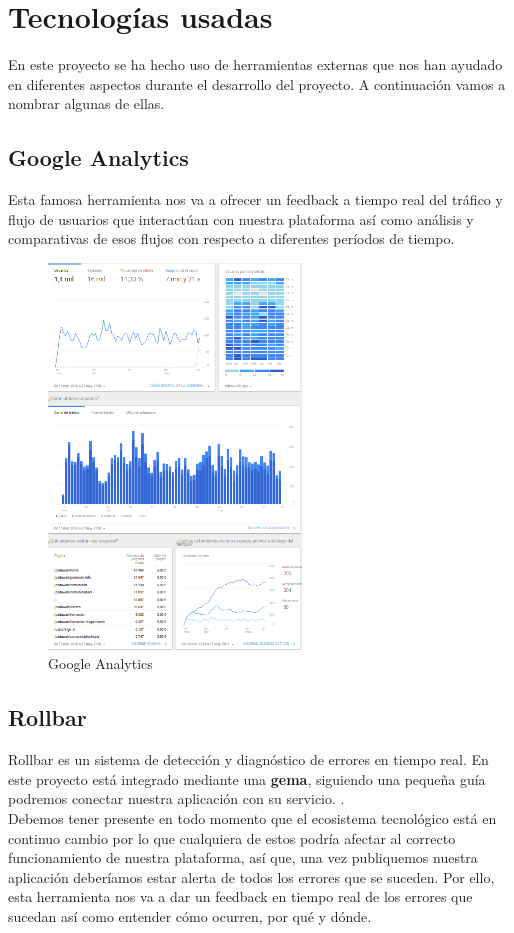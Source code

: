 \setcounter{chapter}{5}
\setcounter{section}{0}
\setcounter{subsection}{0}
\chapter{Tecnologías usadas}

En este proyecto se ha hecho uso de herramientas externas que nos han ayudado en diferentes aspectos durante el desarrollo del proyecto. A continuación vamos a nombrar algunas de ellas.

\newpage
\section{Google Analytics}
Esta famosa herramienta nos va a ofrecer un feedback a tiempo real del tráfico y flujo de usuarios que interactúan con nuestra plataforma así como análisis y comparativas de esos flujos con respecto a diferentes períodos de tiempo.

\begin{figure}[ht]
	\centering
	\includegraphics[width=0.6\textwidth]{imagenes/tecnologias/analytics.png}
	\caption{Google Analytics}
	\label{analytics}
\end{figure}

\newpage
\section{Rollbar}
Rollbar es un sistema de detección y diagnóstico de errores en tiempo real. En este proyecto está integrado mediante una \textbf{gema}, siguiendo una pequeña guía podremos conectar nuestra aplicación con su servicio. \cite{Rollbar1}.\\
Debemos tener presente en todo momento que el ecosistema tecnológico está en continuo cambio por lo que cualquiera de estos podría afectar al correcto funcionamiento de nuestra plataforma, así que, una vez publiquemos nuestra aplicación deberíamos estar alerta de todos los errores que se suceden. Por ello, esta herramienta nos va a dar un feedback en tiempo real de los errores que sucedan así como entender cómo ocurren, por qué y dónde.\\

